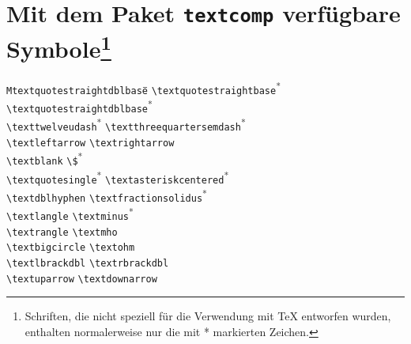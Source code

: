 

\appendix

\enlargethispage*{2.5\baselineskip}

\section[Mit dem Paket \texttt{textcomp} verfügbare Symbole]{Mit dem Paket \texttt{textcomp} verfügbare Symbole\footnote{Schriften, die nicht speziell für die Verwendung mit
\TeX{} entworfen wurden, enthalten normalerweise nur die mit * markierten Zeichen.}}
\label{textsymbols}
{\small
\begin{tabbing}
\quad\quad\=\texttt{Mtextquotestraightdblbase}\hspace{1cm}\=\quad\quad\=\kill
\textquotestraightbase \> \lstinline+\textquotestraightbase+\textsuperscript{*}  \> \textquotestraightdblbase \> \lstinline+\textquotestraightdblbase+\textsuperscript{*} \\
\texttwelveudash \> \lstinline+\texttwelveudash+\textsuperscript{*}  \> \textthreequartersemdash \> \lstinline+\textthreequartersemdash+\textsuperscript{*} \\
\textleftarrow \> \lstinline+\textleftarrow+ \> \textrightarrow \> \lstinline+\textrightarrow+\\
\textblank \> \lstinline+\textblank+ \> \textdollar \> \lstinline+\$+\textsuperscript{*} \\
\textquotesingle \> \lstinline+\textquotesingle+\textsuperscript{*}  \> \textasteriskcentered \> \lstinline+\textasteriskcentered+\textsuperscript{*} \\
\textdblhyphen \> \lstinline+\textdblhyphen+ \> \textfractionsolidus \> \lstinline+\textfractionsolidus+\textsuperscript{*} \\
\textlangle \> \lstinline+\textlangle+ \> \textminus \> \lstinline+\textminus+\textsuperscript{*} \\
\textrangle \> \lstinline+\textrangle+ \> \textmho \> \lstinline+\textmho+\\
\textbigcircle \> \lstinline+\textbigcircle+ \> \textohm \> \lstinline+\textohm+\\
\textlbrackdbl \> \lstinline+\textlbrackdbl+ \> \textrbrackdbl \> \lstinline+\textrbrackdbl+\\
\textuparrow \> \lstinline+\textuparrow+ \> \textdownarrow \> \lstinline+\textdownarrow+\\

\end{tabbing}}
